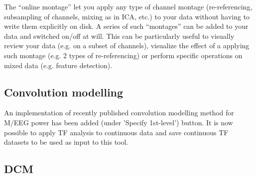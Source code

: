 \documentclass[a4paper,titlepage,openany]{article}
\begin{document}
\begin{multicols}{2}
The ``online montage'' let you apply any type of channel montage (re-referencing, subsampling of channels, mixing as in ICA, etc.) to your data without having to write them explicitly on disk. A series of such ``montages'' can be added to your data and switched on/off at will. This can be particularly useful to visually review your data (e.g. on a subset of channels), visualize the effect of a applying such montage (e.g. 2 types of re-referencing) or perform specific operations on mixed data (e.g. feature detection).

\subsection{Convolution modelling}

An implementation of recently published convolution modelling method for M/EEG power \cite{Litvak_ConvModel_2013} has been added (under 'Specify 1st-level') button. It is now possible to apply TF analysis to continuous data and save continuous TF datasets to be used as input to this tool.

\subsection{DCM}


\end{multicols}
\end{document}
